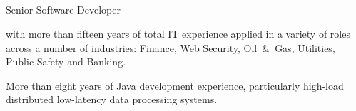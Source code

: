 \documentclass{res}
\newcommand{\osection}[1]{\section{\sc {\Large \textbf{#1}\\}} \vspace{0.30cm}}
\newif\ifFullVersion
\begin{document}
\begin{resume}

\osection{Summary}
\ifFullVersion
\noindent Team Lead / Principal Software Developer
\else
\noindent Senior Software Developer
\fi
with more than fifteen years of total IT experience applied in a variety of roles across a number of industries: Finance, Web Security, Oil~\&~Gas, Utilities, Public Safety and Banking.
\ifFullVersion
Strong engineering background, working knowledge and proven skills in all stages of the software development life-cycle. More than 5~years of team leading experience, ability to interact well at all levels and articulate the IT-specific issues to non-IT colleagues in a clear business-transparent way.\\
\indent Looking for a challenging role where my skills and qualifications will add value and make a significant contribution to the company.
\else
More than eight years of Java development experience, particularly high-load distributed low-latency data processing systems.
\fi


\end{resume}
\end{document}
